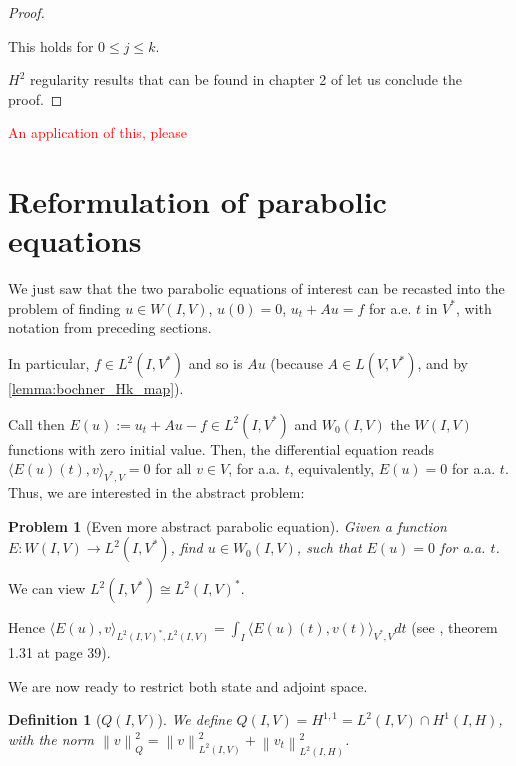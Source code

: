 \documentclass[english,a4paper,9pt,oneside]{scrbook}	%
\theoremstyle{break}
\newtheorem{defn}[equation]{Definition}
\newtheorem{pb}[equation]{Problem}
\newenvironment{mproof}[1][\proofname]{%
  \begin{proof}[#1]$ $\par\nobreak\ignorespaces
}{%
  \end{proof}
}
\renewcommand*{\proofname}{Proof}
\theoremstyle{remark}
\newcommand{\norm}[1]{\left\lVert#1\right\rVert}
\begin{document}
\begin{appendices}
\begin{mproof}
This holds for $0\leq j \leq k$.

$H^2$ regularity results that can be found in chapter 2 of \cite{grisvard} let us conclude the proof.

\end{mproof}

\textcolor{red}{An application of this, please}

\section{Reformulation of parabolic equations}

We just saw that the two parabolic equations of interest can be recasted into the problem of finding $u\in W(I,V)$, $u(0)=0$, $u_t+Au=f$ for a.e. $t$ in $V^*$, with notation from preceding sections.

In particular, $f \in L^2(I, V^*)$ and so is $Au$ (because $A\in L(V,V^*)$, and by \cref{lemma:bochner_Hk_map}).

Call then $E(u):=u_t+Au-f \in L^2(I,V^*)$ and $W_0(I,V)$ the $W(I,V)$ functions with zero initial value. Then, the differential equation reads $\langle E(u)(t),v\rangle_{V^*,V}=0$ for all $v\in V$, for a.a. $t$, equivalently, $E(u)=0$ for a.a. $t$. Thus, we are interested in the abstract problem:

\begin{pb}[Even more abstract parabolic equation]
\label{pb:more_abstr_par}
Given a function $E: W(I,V)\rightarrow L^2(I,V^*)$, find $u\in W_0(I,V)$, such that $E(u)=0$ for a.a. $t$.
\end{pb}
 
We can view $L^2(I,V^*)\cong L^2(I,V)^*$.

Hence $\langle E(u), v\rangle_{L^2(I,V)^*, L^2(I,V)}=\int_I \langle E(u)(t),v(t) \rangle_{V^*,V} dt$ (see \cite{hinze}, theorem 1.31 at page 39).

\color{black}


We are now ready to restrict both state and adjoint space.

\begin{defn}[$Q(I,V)$]
\label{def:Q}
We define $Q(I,V)=H^{1,1}=L^2(I,V)\cap H^1(I,H)$, with the norm $\norm{v}_Q^2=\norm{v}_{L^2(I,V)}^2 + \norm{v_t}_{L^2(I,H)}^2$.
\end{defn}


\end{appendices}
\end{document}
